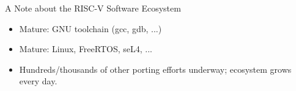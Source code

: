 \documentclass{article}
\begin{document}
\begin{center}
  {\Huge
    A Note about the RISC-V Software Ecosystem}

  \vspace*{1in}

  \begin{minipage}{9in}\LARGE
    \begin{itemize}
    \item Mature: GNU toolchain (gcc, gdb, ...)
    \item Mature: Linux, FreeRTOS, seL4, ...
    \item Hundreds/thousands of other porting efforts underway; ecosystem grows every day.
    \end{itemize}
  \end{minipage}

\end{center}

\clearpage

\end{document}
